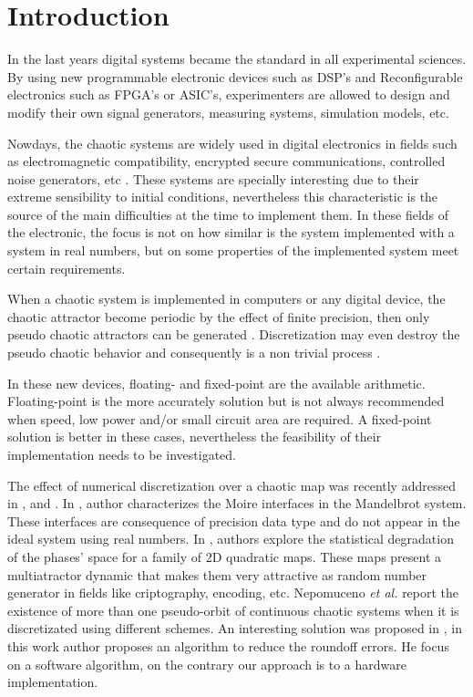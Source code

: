 \section{Introduction} \label{sec:intro}

In the last years digital systems became the standard in all experimental sciences.
By using new programmable electronic devices such as DSP's and Reconfigurable electronics such as FPGA's or ASIC's, experimenters are allowed to design and modify their own signal generators, measuring systems, simulation models, etc.

Nowdays, the chaotic systems are widely used in digital electronics in fields such as electromagnetic compatibility, encrypted secure communications, controlled noise generators, etc \cite{Machado2004,Smaoui2009,DeMicco2017,Antonelli2012,DeMicco2007A,DeMicco2007B}.
These systems are specially interesting due to their extreme sensibility to initial conditions, nevertheless this characteristic is the source of the main difficulties at the time to implement them.  
In these fields of the electronic, the focus is not on how similar is the system implemented with a system in real numbers, but on some properties of the implemented system meet certain requirements.

When a chaotic system is implemented in computers or any digital device, the chaotic attractor become periodic by the effect of finite precision, then only pseudo chaotic attractors can be generated \cite{Alcover2017,Dias2011}.
Discretization may even destroy the pseudo chaotic behavior and consequently is a non trivial process \cite{DeMicco2017,Azzaz2013}.

In these new devices, floating- and fixed-point are the available arithmetic.
Floating-point is the more accurately solution but is not always recommended when speed, low power and/or small circuit area are required.
A fixed-point solution is better in these cases, nevertheless the feasibility of their implementation needs to be investigated.

The effect of numerical discretization over a chaotic map was recently addressed in \cite{Alcover2017}, \cite{DeMicco2017} and \cite{Nepomuceno2017}.
In \cite{Alcover2017}, author characterizes the Moire interfaces in the Mandelbrot system.
These interfaces are consequence of precision data type and do not appear in the ideal system using real numbers.
In \cite{DeMicco2017}, authors explore the statistical degradation of the phases' space for a family of 2D quadratic maps.
These maps present a multiatractor dynamic that makes them very attractive as random number generator in fields like criptography, encoding, etc.
Nepomuceno \textit{et al.} \cite{Nepomuceno2017} report the existence of more than one pseudo-orbit of continuous chaotic systems when it is discretizated using different schemes.
An interesting solution was proposed in \cite{Liao2013}, in this work author proposes an algorithm to reduce the roundoff errors.
He focus on a software algorithm, on the contrary our approach is to a hardware implementation.

